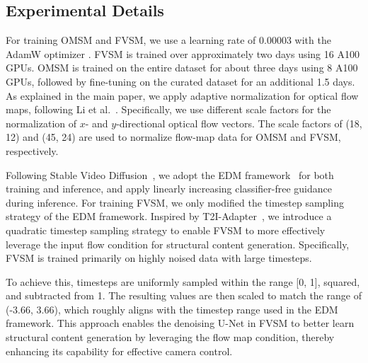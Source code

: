 



\subsection{Experimental Details}
For training OMSM and FVSM, we use a learning rate of 0.00003 with the AdamW optimizer \cite{loshchilov2017decoupled}.
FVSM is trained over approximately two days using 16 A100 GPUs.
OMSM is trained on the entire dataset for about three days using 8 A100 GPUs, followed by fine-tuning on the curated dataset for an additional 1.5 days.
As explained in the main paper, we apply adaptive normalization for optical flow maps, following Li et al.~\cite{li2024generative}.
Specifically, we use different scale factors for the normalization of $x$- and $y$-directional optical flow vectors.
The scale factors of (18, 12) and (45, 24) are used to normalize flow-map data for OMSM and FVSM, respectively.

Following Stable Video Diffusion~\cite{blattmann2023stable}, we adopt the EDM framework~\cite{karras2022elucidating} for both training and inference, and apply linearly increasing classifier-free guidance during inference.
For training FVSM, we only modified the timestep sampling strategy of the EDM framework.
Inspired by T2I-Adapter~\cite{mou2024t2i}, we introduce a quadratic timestep sampling strategy to enable FVSM to more effectively leverage the input flow condition for structural content generation. 
Specifically, FVSM is trained primarily on highly noised data with large timesteps.

To achieve this, timesteps are uniformly sampled within the range [0, 1], squared, and subtracted from 1.
The resulting values are then scaled to match the range of (-3.66, 3.66), which roughly aligns with the timestep range used in the EDM framework.
This approach enables the denoising U-Net in FVSM to better learn structural content generation by leveraging the flow map condition, thereby enhancing its capability for effective camera control.



